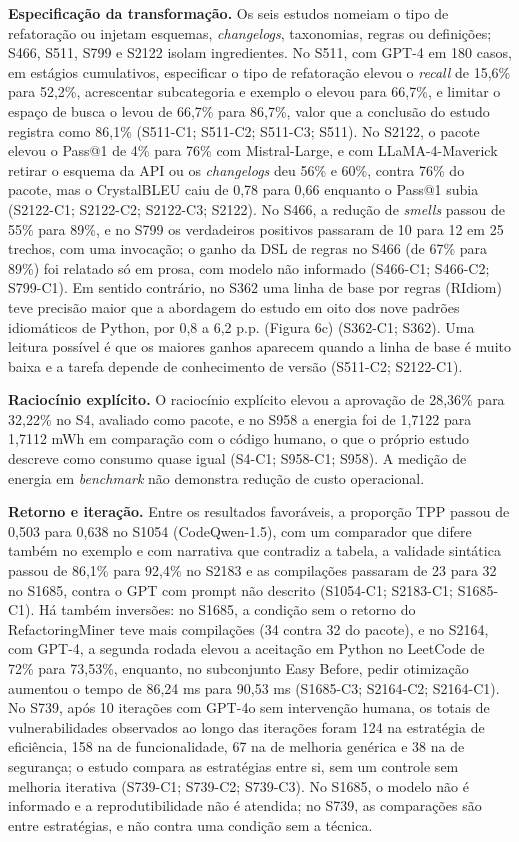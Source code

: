 \textbf{Especificação da transformação.} Os seis estudos nomeiam o tipo de refatoração ou injetam esquemas, \textit{changelogs}, taxonomias, regras ou definições; S466, S511, S799 e S2122 isolam ingredientes.
No S511, com GPT-4 em 180 casos, em estágios cumulativos, especificar o tipo de refatoração elevou o \textit{recall} de 15,6\% para 52,2\%, acrescentar subcategoria e exemplo o elevou para 66,7\%, e limitar o espaço de busca o levou de 66,7\% para 86,7\%, valor que a conclusão do estudo registra como 86,1\% (S511-C1; S511-C2; S511-C3; S511).
No S2122, o pacote elevou o Pass@1 de 4\% para 76\% com Mistral-Large, e com LLaMA-4-Maverick retirar o esquema da API ou os \textit{changelogs} deu 56\% e 60\%, contra 76\% do pacote, mas o CrystalBLEU caiu de 0,78 para 0,66 enquanto o Pass@1 subia (S2122-C1; S2122-C2; S2122-C3; S2122).
No S466, a redução de \textit{smells} passou de 55\% para 89\%, e no S799 os verdadeiros positivos passaram de 10 para 12 em 25 trechos, com uma invocação; o ganho da DSL de regras no S466 (de 67\% para 89\%) foi relatado só em prosa, com modelo não informado (S466-C1; S466-C2; S799-C1).
Em sentido contrário, no S362 uma linha de base por regras (RIdiom) teve precisão maior que a abordagem do estudo em oito dos nove padrões idiomáticos de Python, por 0,8 a 6,2 p.p. (Figura 6c) (S362-C1; S362).
Uma leitura possível é que os maiores ganhos aparecem quando a linha de base é muito baixa e a tarefa depende de conhecimento de versão (S511-C2; S2122-C1).

\textbf{Raciocínio explícito.}
O raciocínio explícito elevou a aprovação de 28,36\% para 32,22\% no S4, avaliado como pacote, e no S958 a energia foi de 1,7122 para 1,7112 mWh em comparação com o código humano, o que o próprio estudo descreve como consumo quase igual (S4-C1; S958-C1; S958).
A medição de energia em \textit{benchmark} não demonstra redução de custo operacional.

\textbf{Retorno e iteração.}
Entre os resultados favoráveis, a proporção TPP passou de 0,503 para 0,638 no S1054 (CodeQwen-1.5), com um comparador que difere também no exemplo e com narrativa que contradiz a tabela, a validade sintática passou de 86,1\% para 92,4\% no S2183 e as compilações passaram de 23 para 32 no S1685, contra o GPT com prompt não descrito (S1054-C1; S2183-C1; S1685-C1).
Há também inversões: no S1685, a condição sem o retorno do RefactoringMiner teve mais compilações (34 contra 32 do pacote), e no S2164, com GPT-4, a segunda rodada elevou a aceitação em Python no LeetCode de 72\% para 73,53\%, enquanto, no subconjunto Easy Before, pedir otimização aumentou o tempo de 86,24 ms para 90,53 ms (S1685-C3; S2164-C2; S2164-C1).
No S739, após 10 iterações com GPT-4o sem intervenção humana, os totais de vulnerabilidades observados ao longo das iterações foram 124 na estratégia de eficiência, 158 na de funcionalidade, 67 na de melhoria genérica e 38 na de segurança; o estudo compara as estratégias entre si, sem um controle sem melhoria iterativa (S739-C1; S739-C2; S739-C3).
No S1685, o modelo não é informado e a reprodutibilidade não é atendida; no S739, as comparações são entre estratégias, e não contra uma condição sem a técnica.

